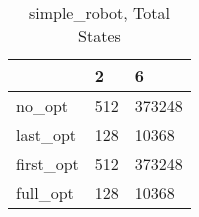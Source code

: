 \begin{table}
\caption{simple\_robot, Total States}
\label{simple_robot_total}
\begin{tabular}{lll}
\toprule
 & 2 & 6 \\
\midrule
no\_opt & 512 & 373248 \\
last\_opt & 128 & 10368 \\
first\_opt & 512 & 373248 \\
full\_opt & 128 & 10368 \\
\bottomrule
\end{tabular}
\end{table}
